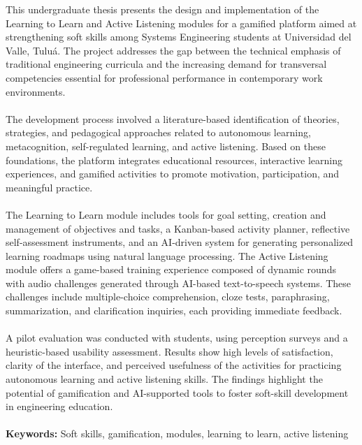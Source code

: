 This undergraduate thesis presents the design and implementation of the Learning to Learn and Active Listening modules for a gamified platform aimed at strengthening soft skills among Systems Engineering students at Universidad del Valle, Tuluá. The project addresses the gap between the technical emphasis of traditional engineering curricula and the increasing demand for transversal competencies essential for professional performance in contemporary work environments.
\\
\\
The development process involved a literature-based identification of theories, strategies, and pedagogical approaches related to autonomous learning, metacognition, self-regulated learning, and active listening. Based on these foundations, the platform integrates educational resources, interactive learning experiences, and gamified activities to promote motivation, participation, and meaningful practice.
\\
\\
The Learning to Learn module includes tools for goal setting, creation and management of objectives and tasks, a Kanban-based activity planner, reflective self-assessment instruments, and an AI-driven system for generating personalized learning roadmaps using natural language processing. The Active Listening module offers a game-based training experience composed of dynamic rounds with audio challenges generated through AI-based text-to-speech systems. These challenges include multiple-choice comprehension, cloze tests, paraphrasing, summarization, and clarification inquiries, each providing immediate feedback.
\\
\\
A pilot evaluation was conducted with students, using perception surveys and a heuristic-based usability assessment. Results show high levels of satisfaction, clarity of the interface, and perceived usefulness of the activities for practicing autonomous learning and active listening skills. The findings highlight the potential of gamification and AI-supported tools to foster soft-skill development in engineering education.
\\
\\
\textbf{Keywords:} Soft skills, gamification, modules, learning to learn, active listening